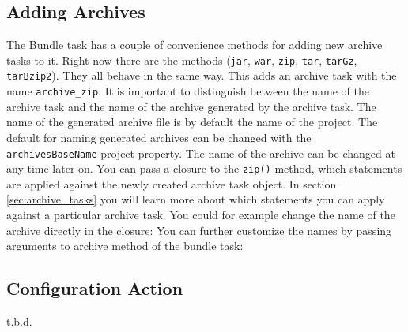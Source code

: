 \subsection{Adding Archives} %
\label{sub:adding_archives}
The Bundle task has a couple of convenience methods for adding new archive tasks to it. Right now there are the methods (\texttt{jar}, \texttt{war}, \texttt{zip}, \texttt{tar}, \texttt{tarGz}, \texttt{tarBzip2}). They all behave in the same way.
This adds an archive task with the name \texttt{archive\_zip}. It is important to distinguish between the name of the archive task and the name of the archive generated by the archive task. The name of the generated archive file is by default the name of the project. The default for naming generated archives can be changed with the \texttt{archivesBaseName} project property. The name of the archive can be changed at any time later on. You can pass a closure to the \texttt{zip()} method, which statements are applied against the newly created archive task object. In section \ref{sec:archive_tasks} you will learn more about which statements you can apply against a particular archive task. You could for example change the name of the archive directly in the closure:
You can further customize the names by passing arguments to archive method of the bundle task:
\subsection{Configuration Action} %
\label{sub:configuration_action}
t.b.d.

